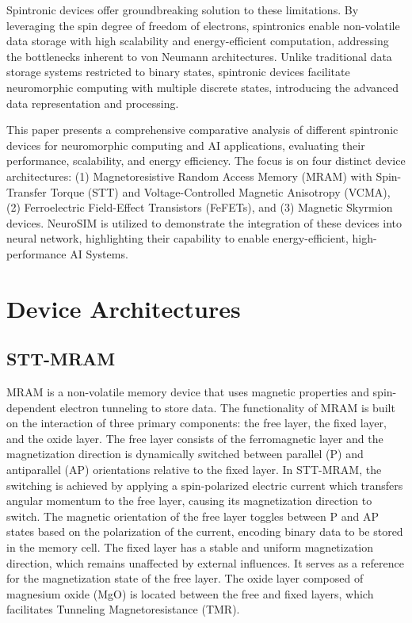 \documentclass[conference]{IEEEtran}
\begin{document}
Spintronic devices offer groundbreaking solution to these limitations. By leveraging the spin degree of freedom of electrons, spintronics enable non-volatile data storage with high scalability and energy-efficient computation, addressing the bottlenecks inherent to von Neumann architectures. Unlike traditional data storage systems restricted to binary states, spintronic devices facilitate neuromorphic computing with multiple discrete states, introducing the advanced data representation and processing.

This paper presents a comprehensive comparative analysis of different spintronic devices for neuromorphic computing and AI applications, evaluating their performance, scalability, and energy efficiency. The focus is on four distinct device architectures: (1) Magnetoresistive Random Access Memory (MRAM) with Spin-Transfer Torque (STT) and Voltage-Controlled Magnetic Anisotropy (VCMA), (2) Ferroelectric Field-Effect Transistors (FeFETs), and (3) Magnetic Skyrmion devices. NeuroSIM is utilized to demonstrate the integration of these devices into neural network, highlighting their capability to enable energy-efficient, high-performance AI Systems. 

\section{Device Architectures}

\subsection{STT-MRAM}
MRAM is a non-volatile memory device that uses magnetic properties and spin-dependent electron tunneling to store data. The functionality of MRAM is built on the interaction of three primary components: the free layer, the fixed layer, and the oxide layer. The free layer consists of the ferromagnetic layer and the magnetization direction is dynamically switched between parallel (P) and antiparallel (AP) orientations relative to the fixed layer. In STT-MRAM, the switching is achieved by applying a spin-polarized electric current which transfers angular momentum to the free layer, causing its magnetization direction to switch. The magnetic orientation of the free layer toggles between P and AP states based on the polarization of the current, encoding binary data to be stored in the memory cell. The fixed layer has a stable and uniform magnetization direction, which remains unaffected by external influences. It serves as a reference for the magnetization state of the free layer. The oxide layer composed of magnesium oxide (MgO) is located between the free and fixed layers, which facilitates Tunneling Magnetoresistance (TMR). 
\end{document}
